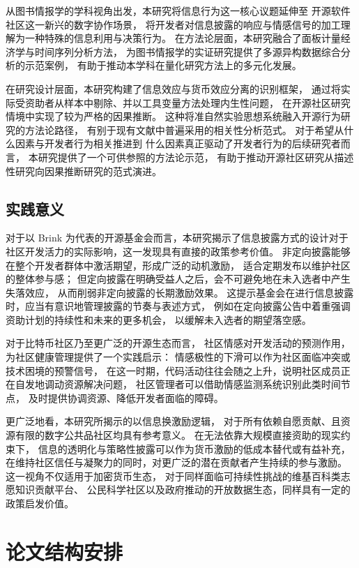 \documentclass[
    type = master, %
    degree = professional,        %
    decl-page,  %
    twoside,                %
    fontset = fandol %
  ]{njuthesis}
\begin{document}
从图书情报学的学科视角出发，本研究将信息行为这一核心议题延伸至
开源软件社区这一新兴的数字协作场景，
将开发者对信息披露的响应与情感信号的加工理解为一种特殊的信息利用与决策行为。
在方法论层面，本研究融合了面板计量经济学与时间序列分析方法，
为图书情报学的实证研究提供了多源异构数据综合分析的示范案例，
有助于推动本学科在量化研究方法上的多元化发展。

在研究设计层面，本研究构建了信息效应与货币效应分离的识别框架，
通过将实际受资助者从样本中剔除、并以工具变量方法处理内生性问题，
在开源社区研究情境中实现了较为严格的因果推断。
这种将准自然实验思想系统融入开源行为研究的方法论路径，
有别于现有文献中普遍采用的相关性分析范式。
对于希望从什么因素与开发者行为相关推进到
什么因素真正驱动了开发者行为的后续研究者而言，
本研究提供了一个可供参照的方法论示范，
有助于推动开源社区研究从描述性研究向因果推断研究的范式演进。

\subsection{实践意义}

对于以 Brink 为代表的开源基金会而言，本研究揭示了信息披露方式的设计对于
社区开发活力的实际影响，这一发现具有直接的政策参考价值。
非定向披露能够在整个开发者群体中激活期望，形成广泛的动机激励，
适合定期发布以维护社区的整体参与感；
但定向披露在明确受益人之后，会不可避免地在未入选者中产生失落效应，
从而削弱非定向披露的长期激励效果。
这提示基金会在进行信息披露时，应当有意识地管理披露的节奏与表述方式，
例如在定向披露公告中着重强调资助计划的持续性和未来的更多机会，
以缓解未入选者的期望落空感。

对于比特币社区乃至更广泛的开源生态而言，
社区情感对开发活动的预测作用，为社区健康管理提供了一个实践启示：
情感极性的下滑可以作为社区面临冲突或技术困境的预警信号，
在这一时期，代码活动往往会随之上升，说明社区成员正在自发地调动资源解决问题，
社区管理者可以借助情感监测系统识别此类时间节点，
及时提供协调资源、降低开发者面临的障碍。

更广泛地看，本研究所揭示的以信息换激励逻辑，
对于所有依赖自愿贡献、且资源有限的数字公共品社区均具有参考意义。
在无法依靠大规模直接资助的现实约束下，
信息的透明化与策略性披露可以作为货币激励的低成本替代或有益补充，
在维持社区信任与凝聚力的同时，对更广泛的潜在贡献者产生持续的参与激励。
这一视角不仅适用于加密货币生态，
对于同样面临可持续性挑战的维基百科类志愿知识贡献平台、
公民科学社区以及政府推动的开放数据生态，同样具有一定的政策启发价值。

\section{论文结构安排}
\end{document}
